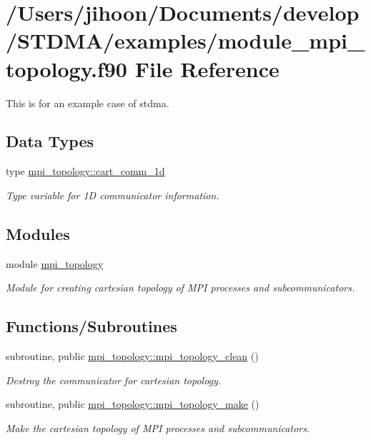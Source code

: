 \hypertarget{module__mpi__topology_8f90}{}\section{/\+Users/jihoon/\+Documents/develop/\+S\+T\+D\+M\+A/examples/module\+\_\+mpi\+\_\+topology.f90 File Reference}
\label{module__mpi__topology_8f90}


This is for an example case of stdma.  


\subsection*{Data Types}
\begin{DoxyCompactItemize}
\item 
type \mbox{\hyperlink{structmpi__topology_1_1cart__comm__1d}{mpi\+\_\+topology\+::cart\+\_\+comm\+\_\+1d}}
\begin{DoxyCompactList}\small\item\em Type variable for 1D communicator information. \end{DoxyCompactList}\end{DoxyCompactItemize}
\subsection*{Modules}
\begin{DoxyCompactItemize}
\item 
module \mbox{\hyperlink{namespacempi__topology}{mpi\+\_\+topology}}
\begin{DoxyCompactList}\small\item\em Module for creating cartesian topology of M\+PI processes and subcommunicators. \end{DoxyCompactList}\end{DoxyCompactItemize}
\subsection*{Functions/\+Subroutines}
\begin{DoxyCompactItemize}
\item 
subroutine, public \mbox{\hyperlink{namespacempi__topology_aa14e91baaec6d1c1082ebd5ac6e19128}{mpi\+\_\+topology\+::mpi\+\_\+topology\+\_\+clean}} ()
\begin{DoxyCompactList}\small\item\em Destroy the communicator for cartesian topology. \end{DoxyCompactList}\item 
subroutine, public \mbox{\hyperlink{namespacempi__topology_a8819f16f50aded913f17520a29d3ec4c}{mpi\+\_\+topology\+::mpi\+\_\+topology\+\_\+make}} ()
\begin{DoxyCompactList}\small\item\em Make the cartesian topology of M\+PI processes and subcommunicators. \end{DoxyCompactList}\end{DoxyCompactItemize}
